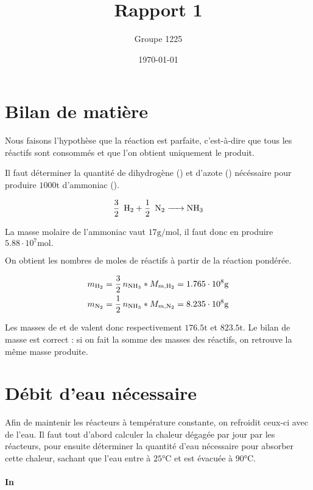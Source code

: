 \documentclass[a4paper, oneside, 12pt]{article}
\title{Rapport 1}
\author{Groupe 1225}
\date{\today}
\begin{document}
\maketitle

\section{Bilan de matière}

Nous faisons l'hypothèse que la réaction est parfaite, 
c'est-à-dire que tous les réactifs sont consommés 
et que l'on obtient uniquement le produit.

Il faut déterminer la quantité de dihydrogène () et d'azote () 
nécéssaire pour produire $1000 \si{\tonne}$ d'ammoniac ().

\begin{equation}
	\ce{\frac{3}{2} \, H2 + \frac{1}{2} \, N2 -> NH3} 
	\label{eq:ammoniac}
\end{equation}

La masse molaire de l'ammoniac vaut $17 \si{\gram\per\mole}$,
il faut donc en produire $5.88 \cdot 10^7 \si{\mole}.$

On obtient les nombres de moles de réactifs à partir de la réaction pondérée. 

\begin{align*}
	m_{\ce{H2}}  = \frac{3}{2} \, n_{\ce{NH3}} * M_{m, \ce{H2}} 
	= 1.765 \cdot 10^8  \si{\gram} \\
	m_{\ce{N2}} = \frac{1}{2} \, n_{\ce{NH3}} * M_{m, \ce{N2}} 
	= 8.235 \cdot 10^8 \si{\gram}
\end{align*}

Les masses de  et de  valent donc 
respectivement $176.5 \si{\tonne}$ et $823.5 \si{\tonne}$.
Le bilan de masse est correct : si on fait la somme des masses des réactifs,
on retrouve la même masse produite.


\section{Débit d'eau nécessaire}

Afin de maintenir les réacteurs à température constante, 
on refroidit ceux-ci avec de l'eau.
Il faut tout d'abord calculer la chaleur dégagée par jour par les réacteurs,
pour ensuite déterminer la quantité d'eau nécessaire pour absorber cette chaleur,
sachant que l'eau entre à $25 \si{\degreeCelsius}$ et 
est évacuée à $90 \si{\degreeCelsius}$. 

\paragraph{In}
\end{document}
